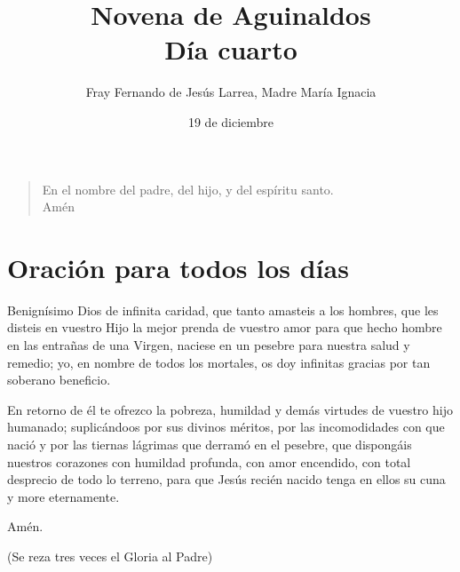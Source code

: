 \documentclass[spanish,utf8,12pt]{chlart}
\title{Novena de Aguinaldos\\Día cuarto}
\author{Fray Fernando de Jesús Larrea, Madre María Ignacia}
\date{19 de diciembre}
\newenvironment{lectura}{\begingroup\color{lector}}{\endgroup\par}
\newenvironment{finalnotes}{\begingroup
	\footnotesize\sffamily\color{Gray}%
	\setlength{\leftskip}{3em}\setlength{\rightskip}{3em}\noindent
	}{\par\endgroup}
\newenvironment{gozo}{\begin{verse}\color{lector}}{\end{verse}}
\begin{document}
\maketitle

\begin{gozo}
En el nombre del padre, del hijo, y del espíritu santo.\\Amén
\end{gozo}
\section{Oración para todos los días}

\begin{lectura}
Benignísimo Dios de infinita caridad, que tanto amasteis a los hombres,
que les disteis en vuestro Hijo la mejor prenda de vuestro amor para que
hecho hombre en las entrañas de una Virgen, naciese en un pesebre para
nuestra salud y remedio; yo, en nombre de todos los mortales, os doy
infinitas gracias por tan soberano beneficio.

En retorno de él te ofrezco la pobreza, humildad y demás virtudes de
vuestro hijo humanado; suplicándoos por sus divinos méritos, por las
incomodidades con que nació y por las tiernas lágrimas que derramó en
el pesebre, que dispongáis nuestros corazones con humildad profunda,
con amor encendido, con total desprecio de todo lo terreno, para que
Jesús recién nacido tenga en ellos su cuna y more eternamente.

Amén.
\end{lectura}
\begin{finalnotes}
(Se reza tres veces el Gloria al Padre)
\end{finalnotes}
\end{document}
